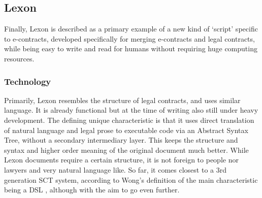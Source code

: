 \documentclass{article}
\begin{document}


\subsection{Lexon}
Finally, Lexon is described as a primary example of a new kind of ‘script’ specific to e-contracts, developed specifically for merging e-contracts and legal contracts, while being easy to write and read for humans without requiring huge computing resources.
\subsubsection{Technology}
Primarily, Lexon \cite{diedrichLexonBibleHitchhiker2020} resembles the structure of legal contracts, and uses similar language. It is already functional but at the time of writing also still under heavy development. The defining unique characteristic is that it uses direct translation of natural language and legal prose to executable code via an Abstract Syntax Tree, without a secondary intermediary layer. This keeps the structure and syntax and higher order meaning of the original document much better. While Lexon documents require a certain structure, it is not foreign to people nor lawyers and very natural language like.
So far, it comes closest to a
3rd generation SCT system, according to Wong’s definition of the main characteristic being a DSL \cite{wongmengComputableContractsAcademia2018}, although with the aim to go even further.
\end{document}
